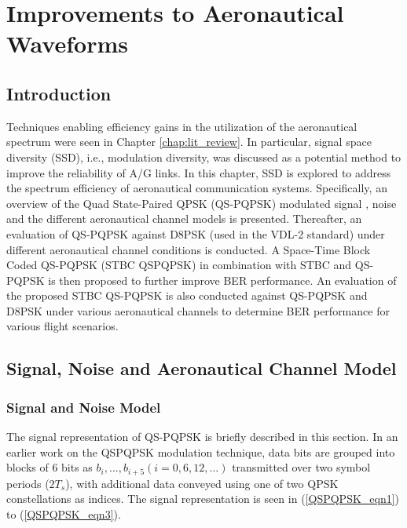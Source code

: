 \chapter{Improvements to Aeronautical Waveforms}
\label{chap:improvements_waveforms}
\section{Introduction}
Techniques enabling efficiency gains in the utilization of the aeronautical spectrum were seen in Chapter \ref{chap:lit_review}. In particular, signal space diversity (SSD), i.e., modulation diversity, was discussed as a potential method to improve the reliability of A/G links. In this chapter, SSD is explored to address the spectrum efficiency of aeronautical communication systems. Specifically, an overview of the Quad State-Paired QPSK (QS-PQPSK) modulated signal \cite{tan2016quad}, noise and the different aeronautical channel models is presented. Thereafter, an evaluation of QS-PQPSK against D8PSK (used in the VDL-2 standard) under different aeronautical channel conditions is conducted. A Space-Time Block Coded QS-PQPSK (STBC QSPQPSK) in combination with STBC and QS-PQPSK is then proposed to further improve BER performance. An evaluation of the proposed STBC QS-PQPSK is also conducted against QS-PQPSK and D8PSK under various aeronautical channels to determine BER performance for various flight scenarios.

\section{Signal, Noise and Aeronautical Channel Model}

\subsection{Signal and Noise Model}

The signal representation of QS-PQPSK is briefly described in this section. In an earlier work \cite{tan2016quad} on the QSPQPSK modulation technique, data bits are grouped into blocks of 6 bits as $b_{i},...,b_{i+5} (i=0,6,12,...)$ transmitted over two symbol periods ($2T_{s}$), with additional data conveyed using one of two QPSK constellations as indices. The signal representation is seen in (\ref{QSPQPSK_eqn1}) to (\ref{QSPQPSK_eqn3}).

